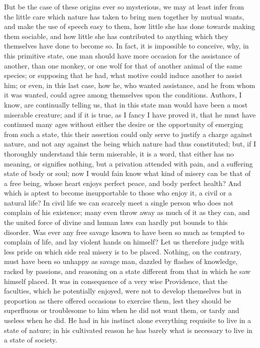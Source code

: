 \documentclass[11pt,twocolumn]{ltugboat}
\begin{document}
But be the case of these origins ever so mysterious, we may at least
infer from the little care which nature has taken to bring men
together by mutual wants, and make the use of speech easy to them, how
little she has done towards making them sociable, and how little she
has contributed to anything which they themselves have done to become
so. In fact, it is impossible to conceive, why, in this primitive
state, one man should have more occasion for the assistance of
another, than one monkey, or one wolf for that of another animal of
the same species; or supposing that he had, what motive could induce
another to assist him; or even, in this last case, how he, who wanted
assistance, and he from whom it was wanted, could agree among
themselves upon the conditions. Authors, I know, are continually
telling us, that in this state man would have been a most miserable
creature; and if it is true, as I fancy I have proved it, that he must
have continued many ages without either the desire or the opportunity
of emerging from such a state, this their assertion could only serve
to justify a charge against nature, and not any against the being
which nature had thus constituted; but, if I thoroughly understand
this term miserable, it is a word, that either has no meaning, or
signifies nothing, but a privation attended with pain, and a suffering
state of body or soul; now I would fain know what kind of misery can
be that of a free being, whose heart enjoys perfect peace, and body
perfect health? And which is aptest to become insupportable to those
who enjoy it, a civil or a natural life? In civil life we can scarcely
meet a single person who does not complain of his existence; many even
throw away as much of it as they can, and the united force of divine
and human laws can hardly put bounds to this disorder. Was ever any
free savage known to have been so much as tempted to complain of life,
and lay violent hands on himself? Let us therefore judge with less
pride on which side real misery is to be placed. Nothing, on the
contrary, must have been so unhappy as savage man, dazzled by flashes
of knowledge, racked by passions, and reasoning on a state different
from that in which he saw himself placed. It was in consequence of a
very wise Providence, that the faculties, which he potentially
enjoyed, were not to develop themselves but in proportion as there
offered occasions to exercise them, lest they should be superfluous or
troublesome to him when he did not want them, or tardy and useless
when he did. He had in his instinct alone everything requisite to live
in a state of nature; in his cultivated reason he has barely what is
necessary to live in a state of society.
\end{document}
